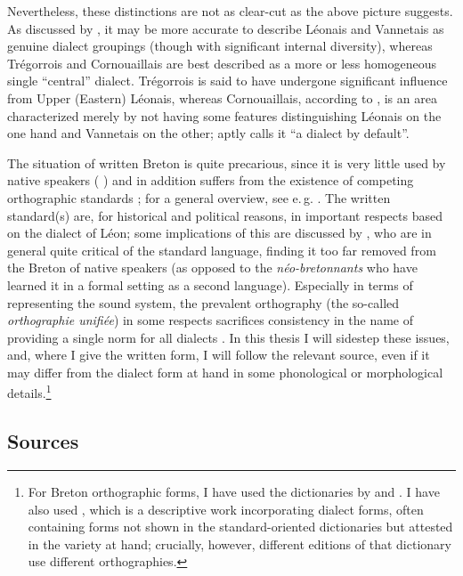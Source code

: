 Nevertheless, these distinctions are not as clear-cut as the above picture suggests. As discussed by \citet[§§23--27]{histbreton}, it may be more accurate to describe Léonais and Vannetais as genuine dialect groupings (though with significant internal diversity), whereas Trégorrois and Cornouaillais are best described as a more or less homogeneous single \enquote{central} dialect. Trégorrois is said to have undergone significant influence from Upper (\ie Eastern) Léonais, whereas Cornouaillais, according to \citet{histbreton}, is an area characterized merely by not having some features distinguishing Léonais on the one hand and Vannetais on the other; \textcite{hewitt73:_moder_liter_breton} aptly calls it \enquote{a dialect by default}.

The situation of written Breton is quite precarious, since it is very little used by native speakers (\citeauthor{hewitt73:_moder_liter_breton} \cite*{hewitt73:_moder_liter_breton}) and in addition suffers from the existence of competing orthographic standards \citep{wmffre07_1,wmffre07_2}; for a general overview, see e.\,g. \citet{hewitt73:_moder_liter_breton,JONES01101995}. The written standard(s) are, for historical and political reasons, in important respects based on the dialect of Léon; some implications of this are discussed by \citet{hewitt73:_moder_liter_breton,wmffre07_1}, who are in general quite critical of the standard language, finding it too far removed from the Breton of native speakers (as opposed to the \emph{néo-bretonnants} who have learned it in a formal setting as a second language). Especially in terms of representing the sound system, the prevalent orthography (the so-called \emph{orthographie unifiée}) in some respects sacrifices consistency in the name of providing a single norm for all dialects \citep{hewitt73:_moder_liter_breton,wmffre07_1,wmffre07_2,madeg10:_trait_nord_ouest}. In this thesis I will sidestep these issues, and, where I give the written form, I will follow the relevant source, even if it may differ from the dialect form at hand in some phonological or morphological details.\footnote{For Breton orthographic forms, I have used the dictionaries by \citet{hemon05} and \citet{cornillet06}. I have also used \citet{favereau97:_geriad_diction}, which is a descriptive work incorporating dialect forms, often containing forms not shown in the standard-oriented dictionaries but attested in the variety at hand; crucially, however, different editions of that dictionary use different orthographies.}

\subsection{Sources}
\label{sec:sources}

